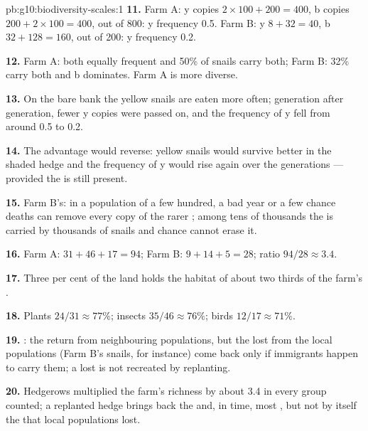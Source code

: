 \begin{solution}{pb:g10:biodiversity-scales:1}
\textbf{11.} Farm A: y copies $2 \times 100 + 200 = 400$, b copies
$200 + 2 \times 100 = 400$, out of 800: y frequency 0.5. Farm B: y
$8 + 32 = 40$, b $32 + 128 = 160$, out of 200: y frequency 0.2.

\textbf{12.} Farm A: both  equally frequent and 50\% of snails
carry both; Farm B: 32\% carry both and b dominates. Farm A is more
diverse.

\textbf{13.} On the bare bank the yellow snails are eaten more often;
generation after generation, fewer y copies were passed on, and the
frequency of y fell from around 0.5 to 0.2.

\textbf{14.} The advantage would reverse: yellow snails would survive
better in the shaded hedge and the frequency of y would rise again
over the generations --- provided the  is still present.

\textbf{15.} Farm B's: in a population of a few hundred, a bad year or
a few chance deaths can remove every copy of the rarer ; among
tens of thousands the  is carried by thousands of snails and
chance cannot erase it.

\textbf{16.} Farm A: $31 + 46 + 17 = 94$; Farm B: $9 + 14 + 5 = 28$;
ratio $94/28 \approx 3.4$.

\textbf{17.} Three per cent of the land holds the habitat of about two
thirds of the farm's .

\textbf{18.} Plants $24/31 \approx 77\%$; insects $35/46 \approx 76\%$;
birds $12/17 \approx 71\%$.

\textbf{19.} : the  return from neighbouring
populations, but the  lost from the local populations (Farm B's
snails, for instance) come back only if immigrants happen to carry
them; a lost  is not recreated by replanting.

\textbf{20.} Hedgerows multiplied the farm's  richness by about
3.4 in every group counted; a replanted hedge brings back the
 and, in time, most , but not by itself the 
that local populations lost.
\end{solution}
